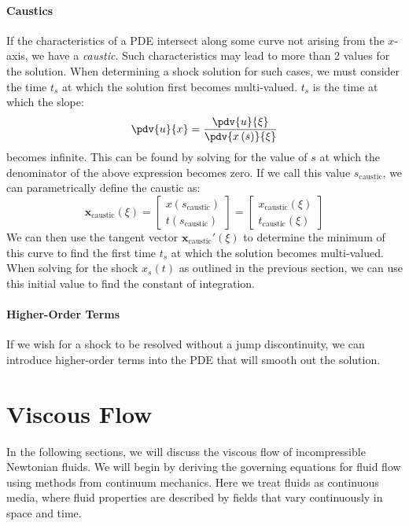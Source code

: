 \documentclass{article}
\theoremstyle{definition}
\begin{document}
\subsection{Caustics}
If the characteristics of a PDE intersect along some curve not arising
from the \(x\)-axis, we have a \textit{caustic}. Such characteristics
may lead to more than 2 values for the solution. When determining a
shock solution for such cases, we must consider the time \(t_s\) at
which the solution first becomes multi-valued. \(t_s\) is the time at
which the slope:
\begin{equation*}
    \pdv{u}{x} = \frac{\pdv{u}{\xi}}{\pdv{x\left( s \right)}{\xi}}
\end{equation*}
becomes infinite. This can be found by solving for the value of \(s\) at
which the denominator of the above expression becomes zero. If we call
this value \(s_{\text{caustic}}\), we can parametrically define the
caustic as:
\begin{equation*}
    \symbf{x}_{\text{caustic}}\left( \xi \right) =
    \begin{bmatrix}
        x\left( s_{\text{caustic}} \right) \\
        t\left( s_{\text{caustic}} \right)
    \end{bmatrix}
    =
    \begin{bmatrix}
        x_{\text{caustic}} \left( \xi \right) \\
        t_{\text{caustic}} \left( \xi \right)
    \end{bmatrix}
\end{equation*}
We can then use the tangent vector \(\symbf{x}_{\text{caustic}}'\left( \xi \right)\)
to determine the minimum of this curve to find the first time \(t_s\) at
which the solution becomes multi-valued. When solving for the shock
\(x_s\left( t \right)\) as outlined in the previous section, we can use
this initial value to find the constant of integration.
\subsection{Higher-Order Terms}
If we wish for a shock to be resolved without a jump discontinuity, we
can introduce higher-order terms into the PDE that will smooth out the
solution.
\part{Viscous Flow}
In the following sections, we will discuss the viscous flow of
incompressible Newtonian fluids. We will begin by deriving the governing
equations for fluid flow using methods from continuum mechanics. Here we
treat fluids as continuous media, where fluid properties are described
by fields that vary continuously in space and time.
\end{document}
